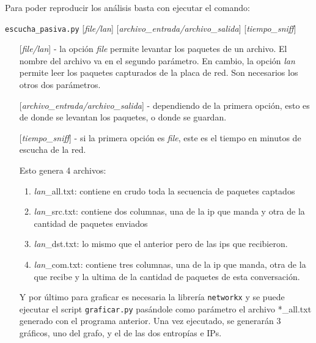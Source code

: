 \documentclass[a4paper, 11pt]{article}
\begin{document}
Para poder reproducir los an\'alisis basta con ejecutar el comando:

\texttt{escucha\_pasiva.py} [\textit{file/lan}] [\textit{archivo\_entrada/archivo\_salida}] [\textit{tiempo\_sniff}]

\begin{itemize}
\item[] [\textit{file/lan}] - la opci\'on \textit{file} permite levantar los paquetes de un archivo. El nombre del archivo va en el segundo par\'ametro. En cambio, la opci\'on \textit{lan} permite leer los paquetes capturados de la placa de red. Son necesarios los otros dos par\'ametros.

\item[] [\textit{archivo\_entrada/archivo\_salida}] - dependiendo de la primera opci\'on, esto es de donde se levantan los paquetes, o donde se guardan.

\item[] [\textit{tiempo\_sniff}] - si la primera opci\'on es \textit{file}, este es el tiempo en minutos de escucha de la red. 

Esto genera 4 archivos: 

\begin{enumerate}
 \item \textit{lan}\_all.txt: contiene en crudo toda la secuencia de paquetes captados
 \item \textit{lan}\_src.txt: contiene dos columnas, una de la ip que manda y otra de la cantidad de paquetes enviados 
 \item \textit{lan}\_dst.txt: lo mismo que el anterior pero de las ips que recibieron. 
 \item \textit{lan}\_com.txt: contiene tres columnas, una de la ip que manda, otra de la que recibe y la ultima de la cantidad de paquetes de esta conversaci\'on. 
\end{enumerate}

Y por \'ultimo para graficar es necesaria la librer\'ia \texttt{networkx} y se puede ejecutar el script \texttt{graficar.py} pas\'andole como par\'ametro el archivo *\_all.txt generado con el programa anterior. Una vez ejecutado, se generar\'an 3 gr\'aficos, uno del grafo, y el de las dos entrop\'ias e IPs.


\end{itemize}
\end{document}
